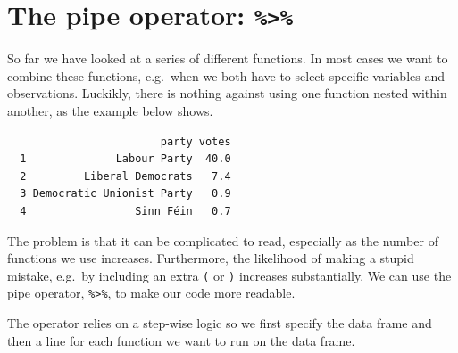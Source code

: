 \documentclass[12pt,oneside]{reedthesis}
\theoremstyle{definition}
\theoremstyle{definition}
\theoremstyle{definition}
\theoremstyle{remark}
\begin{document}
  \section{\texorpdfstring{The pipe operator:
  \texttt{\%\textgreater{}\%}}{The pipe operator: \%\textgreater{}\%}}\label{the-pipe-operator}
  
  So far we have looked at a series of different functions. In most cases
  we want to combine these functions, e.g.~when we both have to select
  specific variables and observations. Luckikly, there is nothing against
  using one function nested within another, as the example below shows.
  \begin{Shaded}
  \begin{Highlighting}[]
  \NormalTok{(}\OperatorTok{>}\StringTok{ }\NormalTok{)}
  \end{Highlighting}
  \end{Shaded}
  \begin{verbatim}
                        party votes
  1              Labour Party  40.0
  2         Liberal Democrats   7.4
  3 Democratic Unionist Party   0.9
  4                 Sinn Féin   0.7
  \end{verbatim}
  The problem is that it can be complicated to read, especially as the
  number of functions we use increases. Furthermore, the likelihood of
  making a stupid mistake, e.g.~by including an extra \texttt{(} or
  \texttt{)} increases substantially. We can use the pipe operator,
  \texttt{\%\textgreater{}\%}, to make our code more readable.
  
  The operator relies on a step-wise logic so we first specify the data
  frame and then a line for each function we want to run on the data
  frame.
  
\end{document}
